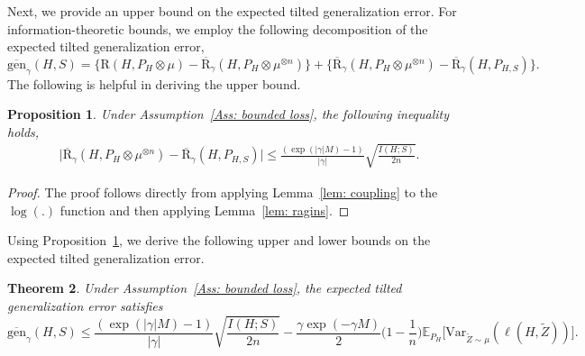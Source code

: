 \documentclass{article}
\theoremstyle{plain}
\theoremstyle{plain}
\newtheorem{theorem}{Theorem}[section]
\newtheorem{proposition}[theorem]{Proposition}
\theoremstyle{definition}
\theoremstyle{remark}
\newcommand{\var}{\mathrm{Var}}
\newcommand{\RTrue}{\mathrm{R}}
\newcommand{\RTT}{\overline{\mathrm{R}}_{\gamma}}
\begin{document}
Next, we provide an upper bound on the expected tilted generalization error. For information-theoretic bounds, we employ the following decomposition of the expected tilted generalization error,
\begin{equation}
   \overline{\mathrm{gen}}_{\gamma}(H,S) = \{ \RTrue(H, P_{H}\otimes \mu) - \RTT(H,P_{H}\otimes \mu^{\otimes n}) \} 
        + \{ \RTT(H,P_{H}\otimes \mu^{\otimes n})-\RTT(H,P_{H,S}) \}.
  \label{eq:decomp}
\end{equation}
The following is helpful in deriving the upper bound.
\begin{proposition}\label{prop: upper via Mutual}
    Under Assumption~\ref{Ass: bounded loss}, the following inequality holds,
\begin{equation*}
    \begin{split}
        &\Big|\RTT(H,P_{H}\otimes \mu^{\otimes n})-\RTT(H,P_{H,S})\Big|\leq \frac{(\exp(|\gamma| M)-1)}{|\gamma|}\sqrt{\frac{ I(H;S)}{2n}}.
    \end{split}
\end{equation*}
\end{proposition}
\begin{proof}
     The proof follows directly from applying Lemma~\ref{lem: coupling} to the $\log(.)$ function and then applying Lemma~\ref{lem: ragins}.
\end{proof}
Using Proposition~\ref{prop: upper via Mutual}, we derive the following upper and lower bounds on the expected tilted generalization error.
\begin{tcolorbox}
    \begin{theorem}\label{thm: expected bound}
     Under Assumption~\ref{Ass: bounded loss},  the expected tilted generalization error satisfies
        \begin{equation*}
      \overline{\mathrm{gen}}_{\gamma}(H,S)\leq \frac{(\exp(|\gamma| M)-1)}{|\gamma|}\sqrt{\frac{ I(H;S)}{2n}}-\frac{\gamma\exp(-\gamma M)}{2}\big(1-\frac{1}{n}\big) \mathbb{E}_{P_H}\big[\var_{\tilde Z\sim\mu}(\ell(H,\tilde Z))\big].
    \end{equation*}
\end{theorem}
\end{tcolorbox}
\end{document}
